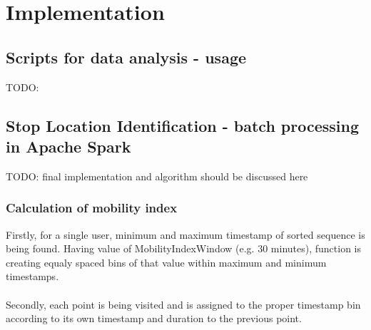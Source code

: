 \chapter{Implementation}
\label{cha:implementation}

\section{Scripts for data analysis - usage}

TODO: 

\section{Stop Location Identification - batch processing in Apache Spark}

TODO: final implementation and algorithm should be discussed here

\subsection{Calculation of mobility index}

Firstly, for a single user, minimum and maximum timestamp of sorted sequence is being found. Having value of MobilityIndexWindow (e.g. 30 minutes), function is creating equaly spaced bins of that value within maximum and minimum timestamps. 
\\\\
Secondly, each point is being visited and is assigned to the proper timestamp bin according to its own timestamp and duration to the previous point. 

